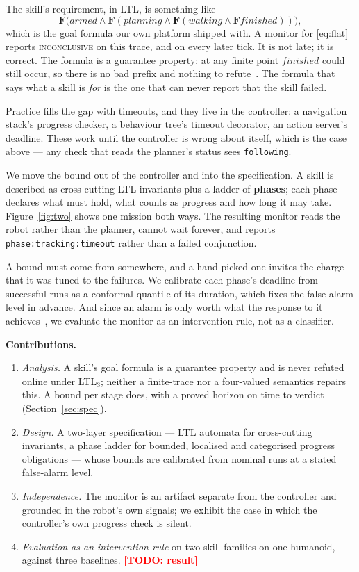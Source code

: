 \documentclass[letterpaper, 10pt, journal, twoside]{IEEEtran}
\newcommand{\TODO}[1]{\textcolor{red}{\textbf{[TODO: #1]}}}
\newcommand{\F}{\mathbf{F}}
\begin{document}
The skill's requirement, in LTL, is something like
\begin{equation}
\label{eq:flat}
\F\big(\mathit{armed} \wedge \F(\mathit{planning} \wedge
  \F(\mathit{walking} \wedge \F \mathit{finished}))\big),
\end{equation}
which is the goal formula our own platform shipped with. A monitor for
\eqref{eq:flat} reports \textsc{inconclusive} on this trace, and on
every later tick. It is not late; it is correct. The formula is a
guarantee property: at any finite point $\mathit{finished}$ could still
occur, so there is no bad prefix and nothing to
refute~\cite{manna1990hierarchy,bauer2011runtime}. The formula that says
what a skill is \emph{for} is the one that can never report that the
skill failed.

Practice fills the gap with timeouts, and they live in the controller: a
navigation stack's progress checker, a behaviour tree's timeout
decorator, an action server's deadline. These work until the controller
is wrong about itself, which is the case above --- any check that reads
the planner's status sees \texttt{following}.

We move the bound out of the controller and into the specification. A
skill is described as cross-cutting LTL invariants plus a ladder of
\textbf{phases}; each phase declares what must hold, what counts as
progress and how long it may take. Figure~\ref{fig:two} shows one
mission both ways. The resulting monitor reads the robot rather than the
planner, cannot wait forever, and reports
\texttt{phase:tracking:timeout} rather than a failed conjunction.

A bound must come from somewhere, and a hand-picked one invites the
charge that it was tuned to the failures. We calibrate each phase's
deadline from successful runs as a conformal quantile of its duration,
which fixes the false-alarm level in advance. And since an alarm is only
worth what the response to it achieves~\cite{ahmedt2026rescue}, we
evaluate the monitor as an intervention rule, not as a classifier.

\textbf{Contributions.}
\begin{enumerate}
  \item \emph{Analysis.} A skill's goal formula is a guarantee property
  and is never refuted online under LTL$_3$; neither a finite-trace nor
  a four-valued semantics repairs this. A bound per stage does, with a
  proved horizon on time to verdict (Section~\ref{sec:spec}).
  \item \emph{Design.} A two-layer specification --- LTL automata for
  cross-cutting invariants, a phase ladder for bounded, localised and
  categorised progress obligations --- whose bounds are calibrated from
  nominal runs at a stated false-alarm level.
  \item \emph{Independence.} The monitor is an artifact separate from
  the controller and grounded in the robot's own signals; we exhibit
  the case in which the controller's own progress check is silent.
  \item \emph{Evaluation as an intervention rule} on two skill families
  on one humanoid, against three baselines. \TODO{result}
\end{enumerate}
\end{document}
